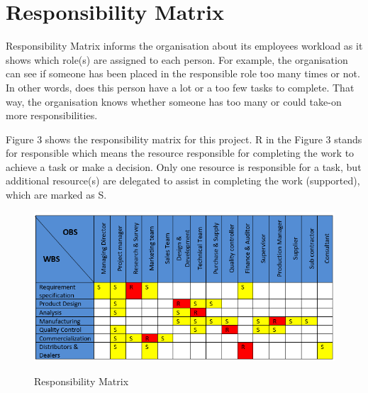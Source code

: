 \section{ Responsibility Matrix } \label{ Responsibility Matrix }
\noindent Responsibility Matrix informs the organisation about its employees workload as it shows which role(s) are assigned to each person. For example, the organisation can see if someone has been placed in the responsible role too many times or not. In other words, does this person have a lot or a too few tasks to complete. That way, the organisation knows whether someone has too many or could take-on more responsibilities.

\noindent  Figure 3 shows the responsibility matrix for this project. R in the Figure 3 stands for responsible which means the resource responsible for completing the work to achieve a task or make a decision. Only one resource is responsible for a task, but additional resource(s) are delegated to assist in completing the work (supported), which are marked as S.

\begin{figure}[H]
\centering
{\includegraphics[scale=1.0]{matrix.png}}
\caption{Responsibility Matrix}
\end{figure}

